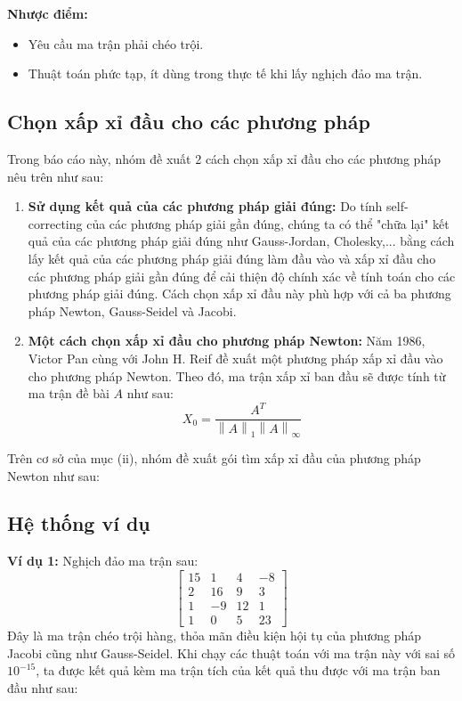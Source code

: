         \par \textbf{Nhược điểm:}
        \begin{itemize}
            \item Yêu cầu ma trận phải chéo trội.
            \item Thuật toán phức tạp, ít dùng trong thực tế khi lấy nghịch đảo ma trận.
        \end{itemize}

\subsection{Chọn xấp xỉ đầu cho các phương pháp}

    Trong báo cáo này, nhóm đề xuất 2 cách chọn xấp xỉ đầu cho các phương pháp nêu trên như sau:

    \begin{enumerate}[label=(\roman*)]
        \item \textbf{Sử dụng kết quả của các phương pháp giải đúng:} Do tính self-correcting của các phương pháp giải gần đúng, chúng ta có thể "chữa lại" kết quả của các phương pháp giải đúng như Gauss-Jordan, Cholesky,... bằng cách lấy kết quả của các phương pháp giải đúng làm đầu vào và xấp xỉ đầu cho các phương pháp giải gần đúng để cải thiện độ chính xác về tính toán cho các phương pháp giải đúng. Cách chọn xấp xỉ đầu này phù hợp với cả ba phương pháp Newton, Gauss-Seidel và Jacobi.
        
        \item \textbf{Một cách chọn xấp xỉ đầu cho phương pháp Newton:} Năm 1986, Victor Pan cùng với John H. Reif \cite{PanReif} đề xuất một phương pháp xấp xỉ đầu vào cho phương pháp Newton. Theo đó, ma trận xấp xỉ ban đầu sẽ được tính từ ma trận đề bài $A$ như sau:
        $$ X_{0} = \frac{A^{T}}{\left\lVert A \right\rVert_{1}\left\lVert A \right\rVert_{\infty}} $$
    \end{enumerate} 

    Trên cơ sở của mục (ii), nhóm đề xuất gói tìm xấp xỉ đầu của phương pháp Newton như sau:
    
    

    \newpage

\subsection{Hệ thống ví dụ}

    \textbf{Ví dụ 1:} Nghịch đảo ma trận sau:
    $$
        \begin{bmatrix}
            15 & 1  & 4  & -8 \\
            2  & 16 & 9  & 3  \\
            1  & -9 & 12 & 1  \\
            1  & 0  & 5  & 23 
        \end{bmatrix}
    $$
    Đây là ma trận chéo trội hàng, thỏa mãn điều kiện hội tụ của phương pháp Jacobi cũng như Gauss-Seidel. Khi chạy các thuật toán với ma trận này với sai số $10^{-15}$, ta được kết quả kèm ma trận tích của kết quả thu được với ma trận ban đầu như sau: 
    
